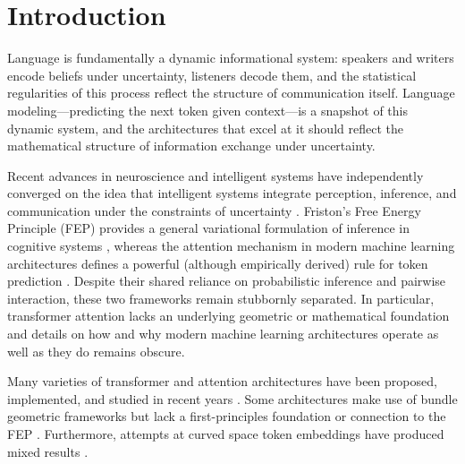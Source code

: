 \documentclass[twoside,11pt]{article}
\begin{document}
\section{Introduction}

Language is fundamentally a dynamic informational system: speakers and writers encode beliefs under uncertainty, listeners decode them, and the statistical regularities of this process reflect the structure of communication itself. Language modeling---predicting the next token given context---is a snapshot of this dynamic system, and the architectures that excel at it should reflect the mathematical structure of information exchange under uncertainty.

Recent advances in neuroscience and intelligent systems have independently converged on the idea that intelligent systems integrate perception, inference, and communication under the constraints of uncertainty \citep{bahdanau2014neural,amari1998natural,bronstein2021geometric,foerster2016learning,wooldridge2009introduction}. Friston's Free Energy Principle (FEP) provides a general variational formulation of inference in cognitive systems \citep{friston2010free,parr2022active,friston2017graphical,ramstead2020variational}, whereas the attention mechanism in modern machine learning architectures defines a powerful (although empirically derived) rule for token prediction \citep{clark2019does,vaswani2017attention}. Despite their shared reliance on probabilistic inference and pairwise interaction, these two frameworks remain stubbornly separated. In particular, transformer attention lacks an underlying geometric or mathematical foundation and details on how and why modern machine learning architectures operate as well as they do remains obscure.

Many varieties of transformer and attention architectures have been proposed, implemented, and studied in recent years \citep{fuchs2020se3,thomas2018tensor}. Some architectures make use of bundle geometric frameworks but lack a first-principles foundation or connection to the FEP \citep{kondor2018generalization,finzi2020generalizing,bronstein2021geometric}. Furthermore, attempts at curved space token embeddings have produced mixed results \citep{bonnabel2013stochastic,absil2008optimization}.
\end{document}
